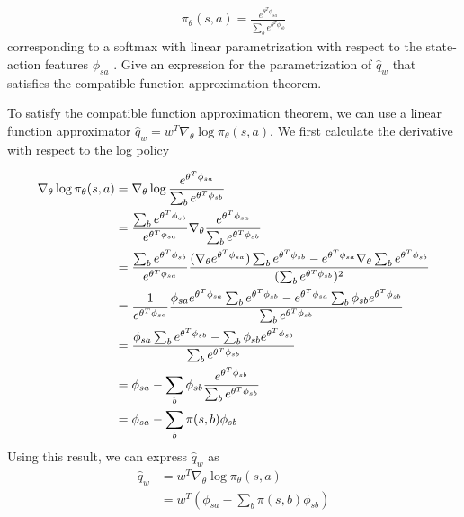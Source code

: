 \documentclass{exam}
\begin{document}
\begin{enumerate}
    \begin{align*}
        \pi_{\theta}(s, a) = \frac{e^{\theta^T \phi_{sa}}}{\sum_b e^{\theta^T \phi_{sb}}}
    \end{align*}
            corresponding to a softmax with linear parametrization with respect to the state-action features $\phi_{sa}$ . Give an expression for the parametrization of $\hat{q}_w$ that satisfies the compatible function approximation theorem.
            \begin{solutionorlines}[2in]
            To satisfy the compatible function approximation theorem, we can use a linear function approximator $\hat{q}_w = w^T \nabla_{\theta} \log \pi_{\theta} (s, a)$.
            We first calculate the derivative with respect to the log policy

            \begin{align*}
                \nabla_{\theta} \log \pi_{\theta} (s, a) &= \nabla_{\theta} \log \frac{e^{\theta^T \phi_{sa}}}{\sum_b e^{\theta^T \phi_{sb}}} \\
                &= \frac{\sum_b e^{\theta^T \phi_{sb}}}{e^{\theta^T \phi_{sa}}} \nabla_{\theta} \frac{e^{\theta^T \phi_{sa}}}{\sum_b e^{\theta^T \phi_{sb}}} \\
                &= \frac{\sum_b e^{\theta^T \phi_{sb}}}{e^{\theta^T \phi_{sa}}} \frac{(\nabla_{\theta} e^{\theta^T \phi_{sa}}) \sum_b e^{\theta^T \phi_{sb}} - e^{\theta^T \phi_{sa}} \nabla_{\theta}  \sum_b e^{\theta^T \phi_{sb}}}{(\sum_b e^{\theta^T \phi_{sb}})^2} \\
                &= \frac{1}{e^{\theta^T \phi_{sa}}} \frac{\phi_{sa} e^{\theta^T \phi_{sa}} \sum_b e^{\theta^T \phi_{sb}} - e^{\theta^T \phi_{sa}} \sum_b \phi_{sb} e^{\theta^T \phi_{sb}} }{\sum_b e^{\theta^T \phi_{sb}}} \\
                &=  \frac{\phi_{sa} \sum_b e^{\theta^T \phi_{sb}} - \sum_b \phi_{sb} e^{\theta^T \phi_{sb}} }{\sum_b e^{\theta^T \phi_{sb}}} \\
                &= \phi_{sa} - \sum_b \phi_{sb} \frac{ e^{\theta^T \phi_{sb}}}{\sum_b e^{\theta^T \phi_{sb}}} \\
                &= \phi_{sa} - \sum_b  \pi (s, b)\phi_{sb}
            \end{align*}
            Using this result, we can express $\hat{q}_w$ as
            \begin{align*}
                \hat{q}_w &= w^T \nabla_{\theta} \log \pi_{\theta} (s, a) \\
                &= w^T (\phi_{sa} - \sum_b  \pi (s, b)\phi_{sb}) \\
            \end{align*}
            
            \end{solutionorlines}
    \end{enumerate}
\end{document}
